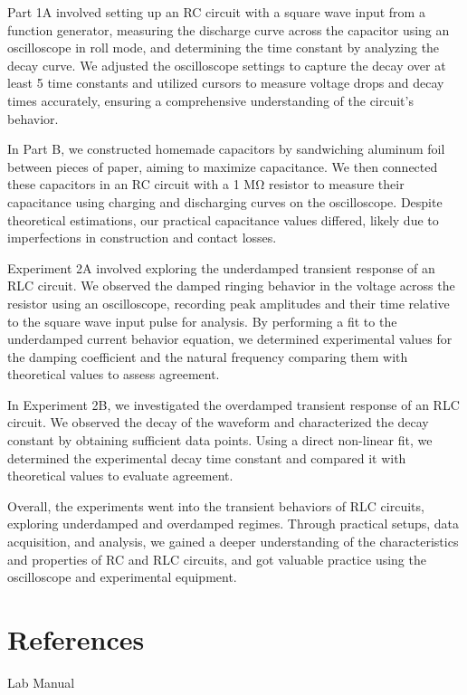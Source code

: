 \documentclass[11pt]{article}
\let\oldsection\section
\renewcommand\section{\clearpage\oldsection}
\begin{document}
    Part 1A involved setting up an RC circuit with a square wave input from a function generator, measuring the discharge curve across the capacitor using an oscilloscope in roll mode, and determining the time constant by analyzing the decay curve. We adjusted the oscilloscope settings to capture the decay over at least 5 time constants and utilized cursors to measure voltage drops and decay times accurately, ensuring a comprehensive understanding of the circuit's behavior.

    In Part B, we constructed homemade capacitors by sandwiching aluminum foil between pieces of paper, aiming to maximize capacitance. We then connected these capacitors in an RC circuit with a 1 MΩ resistor to measure their capacitance using charging and discharging curves on the oscilloscope. Despite theoretical estimations, our practical capacitance values differed, likely due to imperfections in construction and contact losses.

    Experiment 2A involved exploring the underdamped transient response of an RLC circuit. We observed the damped ringing behavior in the voltage across the resistor using an oscilloscope, recording peak amplitudes and their time relative to the square wave input pulse for analysis. By performing a fit to the underdamped current behavior equation, we determined experimental values for the damping coefficient and the natural frequency comparing them with theoretical values to assess agreement.

    In Experiment 2B, we investigated the overdamped transient response of an RLC circuit. We observed the decay of the waveform and characterized the decay constant by obtaining sufficient data points. Using a direct non-linear fit, we determined the experimental decay time constant and compared it with theoretical values to evaluate agreement.

    Overall, the experiments went into the transient behaviors of RLC circuits, exploring underdamped and overdamped regimes. Through practical setups, data acquisition, and analysis, we gained a deeper understanding of the characteristics and properties of RC and RLC circuits, and got valuable practice using the oscilloscope and experimental equipment.



    \appendix
    \section{References}\label{sec:references}

    Lab Manual
\end{document}
